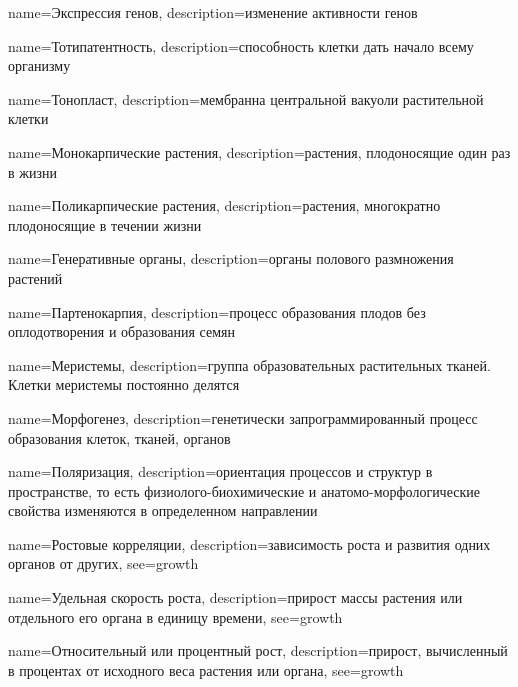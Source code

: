 {
name={Экспрессия генов},
description={изменение активности генов}
}

{
name={Тотипатентность},
description={способность клетки дать начало всему организму}
}

{
name={Тонопласт},
description={мембранна центральной вакуоли растительной клетки}
}

{
name={Монокарпические растения},
description={растения, плодоносящие один раз в жизни}
}

{
name={Поликарпические растения},
description={растения, многократно плодоносящие в течении жизни}
}

{
name={Генеративные органы},
description={органы полового размножения растений}
}

{
name={Партенокарпия},
description={процесс образования плодов без оплодотворения и образования семян}
}

{
name={Меристемы},
description={группа образовательных растительных тканей. Клетки меристемы постоянно делятся}
}

{
name={Морфогенез},
description={генетически запрограммированный процесс образования клеток, тканей, органов}
}

{
name={Поляризация},
description={ориентация процессов и структур в пространстве, то есть физиолого-биохимические и анатомо-морфологические свойства изменяются в определенном направлении}
}

{
name={Ростовые корреляции},
description={зависимость роста и развития одних органов от других},
see={growth}
}

{
name={Удельная скорость роста},
description={прирост массы растения или отдельного его органа в единицу времени},
see={growth}
}

{
name={Относительный или процентный рост},
description={прирост, вычисленный в процентах от исходного веса растения или органа},
see={growth}
}
 
